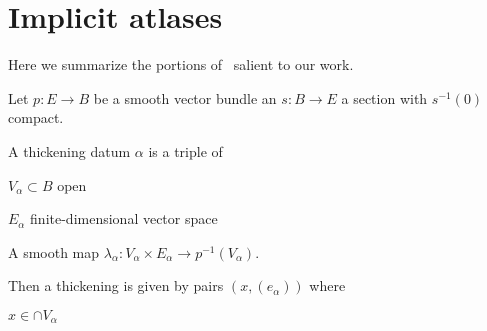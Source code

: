  
\section{Implicit atlases}

Here we summarize the portions of~\cite{pardon} salient to our work.


\begin{example}
Let $p: E \to B$ be a smooth vector bundle an $s: B \to E$ a section with $s^{-1}(0)$ compact.

A thickening datum $\alpha$ is a triple of
\enum
	\item $V_\alpha \subset B$ open
	\item $E_\alpha$ finite-dimensional vector space
	\item A smooth map $\lambda_\alpha: V_\alpha \times E_\alpha \to p^{-1}(V_\alpha).$
\enumd

Then a thickening is given by pairs $(x, (e_\alpha))$ where
\enum
	\item $x \in \cap V_\alpha$
	\item {}
\enumd

\end{example}